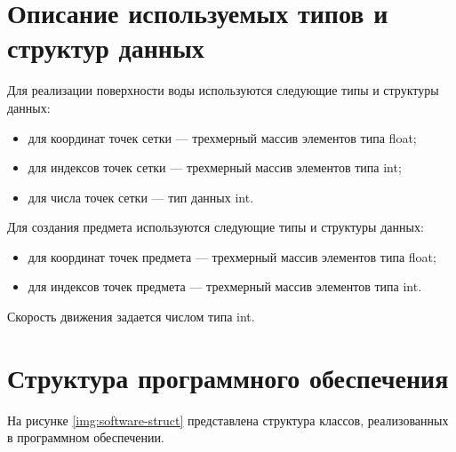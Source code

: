 \section{Описание используемых типов и \newline структур данных}

Для реализации поверхности воды используются следующие типы и структуры данных: 

\begin{itemize}
	\item для координат точек сетки --- трехмерный массив элементов типа float;
	\item для индексов точек сетки --- трехмерный массив элементов типа int;
	\item для числа точек сетки --- тип данных int.
\end{itemize}

Для создания предмета используются следующие типы и структуры данных:

\begin{itemize}
	\item для координат точек предмета --- трехмерный массив элементов типа float;
	\item для индексов точек предмета --- трехмерный массив элементов типа int.
\end{itemize}

Скорость движения задается числом типа int.

\section{Структура программного обеспечения}

На рисунке \ref{img:software-struct} представлена структура классов, реализованных в программном обеспечении.

